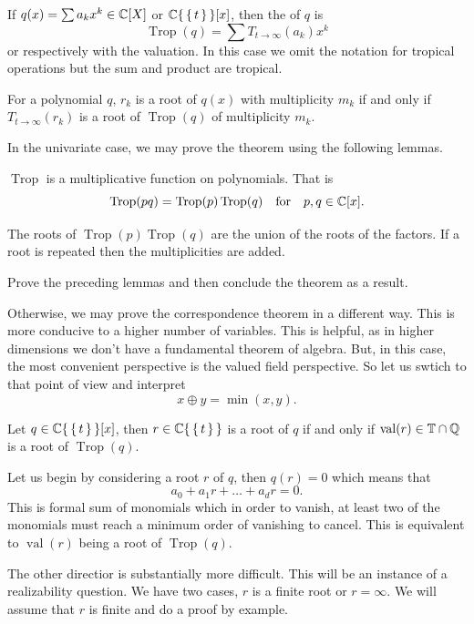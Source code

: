 \documentclass[12pt]{memoir}
\DeclareMathOperator{\val}{val}
\DeclareMathOperator{\Trop}{Trop}
\theoremstyle{definition}
\begin{document}
\begin{Def}
    If $q(x)=\sum a_kx^k\in\mathbb{C}[X]$ or $\mathbb{C}\{\,\{\,t\,\}\,\}[x]$, then the  of $q$ is 
    $$\Trop(q)=\sum T_{t\to\infty}(a_k)x^k$$
    or respectively with the valuation. In this case we omit the notation for tropical operations but the sum and product are tropical.
\end{Def}

\begin{Th}
For a polynomial $q$, $r_k$ is a root of $q(x)$ with multiplicity $m_k$ if and only if $T_{t\to\infty}(r_k)$ is a root of $\Trop(q)$ of multiplicity $m_k$.
\end{Th}

In the univariate case, we may prove the theorem using the following lemmas.

\begin{Lem}
$\Trop$ is a multiplicative function on polynomials. That is
$$\Trop(pq)=\Trop(p)\Trop(q)\word{for}p,q\in\bC[x].$$
\end{Lem}

\begin{Lem}
The roots of $\Trop(p)\Trop(q)$ are the union of the roots of the factors. If a root is repeated then the multiplicities are added.
\end{Lem}

\begin{Ej}[2]
Prove the preceding lemmas and then conclude the theorem as a result.
\end{Ej}

Otherwise, we may prove the correspondence theorem in a different way. This is more conducive to a higher number of variables. This is helpful, as in higher dimensions we don't have a fundamental theorem of algebra. But, in this case, the most convenient perspective is the valued field perspective. So let us swtich to that point of view and interpret 
$$x\oplus y=\min(x,y).$$

\begin{Th}
Let $q\in\mathbb{C}\{\,\{\,t\,\}\,\}[x]$, then $r\in\mathbb{C}\{\,\{\,t\,\}\,\}$ is a root of $q$ if and only if $\val(r)\in\bT\cap\bQ$ is a root of $\Trop(q)$.
\end{Th}

\begin{ptcbp}
Let us begin by considering a root $r$ of $q$, then $q(r)=0$ which means that 
$$a_0+a_1r+\dots+a_dr=0.$$
This is formal sum of monomials which in order to vanish, at least two of the monomials must reach a minimum order of vanishing to cancel. This is equivalent to $\val(r)$ being a root of $\Trop(q)$. \par %
The other directior is substantially more difficult. This will be an instance of a realizability question. We have two cases, $r$ is a finite root or $r=\infty$. We will assume that $r$ is finite and do a proof by example. 
\end{ptcbp}
\end{document}
